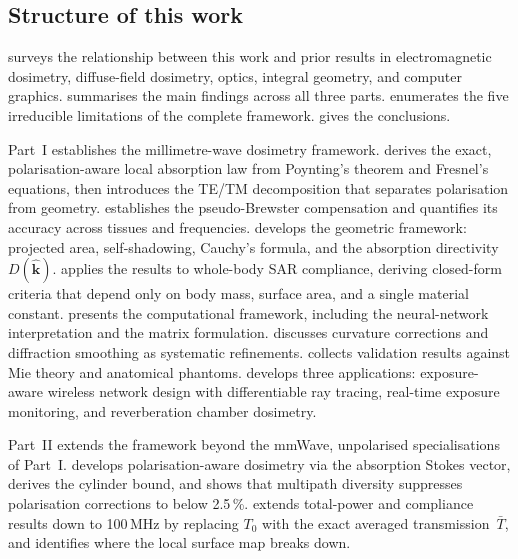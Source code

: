 \documentclass[11pt,a4paper]{article}
\theoremstyle{definition}      %
\newcommand{\khat}{\hat{\bm{k}}}
\newcommand{\Tbar}{\bar{T}}
\begin{document}
\subsection{Structure of this work}

 surveys the relationship between this work
and prior results in electromagnetic dosimetry, diffuse-field
dosimetry, optics, integral geometry, and computer graphics.
 summarises the main findings across all three
parts.
 enumerates the five irreducible limitations
of the complete framework.
 gives the conclusions.

Part~I establishes the millimetre-wave dosimetry framework.
 derives the exact, polarisation-aware local
absorption law from Poynting's theorem and Fresnel's equations, then
introduces the TE/TM decomposition that separates polarisation from
geometry.   establishes the pseudo-Brewster
compensation and quantifies its accuracy across tissues and
frequencies.   develops the geometric framework:
projected area, self-shadowing, Cauchy's formula, and the absorption
directivity~$D(\khat)$.   applies the results to
whole-body SAR compliance, deriving closed-form criteria that depend
only on body mass, surface area, and a single material constant.
 presents the computational framework, including
the neural-network interpretation and the matrix formulation.
 discusses curvature corrections and diffraction
smoothing as systematic refinements.
 collects validation results against Mie theory
and anatomical phantoms.
 develops three applications: exposure-aware wireless
network design with differentiable ray tracing, real-time exposure monitoring,
and reverberation chamber dosimetry.

Part~II extends the framework beyond the mmWave, unpolarised
specialisations of Part~I.
 develops polarisation-aware dosimetry via
the absorption Stokes vector, derives the cylinder bound, and shows
that multipath diversity suppresses polarisation corrections to below
2.5\,\%.
 extends total-power and compliance results down to
100\,MHz by replacing $T_0$ with the exact averaged
transmission~$\Tbar$, and identifies where the local surface map
breaks down.
\end{document}
